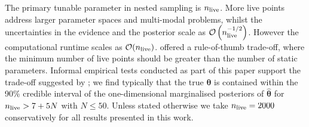 \documentclass[fleqn,usenatbib,useAMS]{mnras}
\begin{document}
The primary tunable parameter in nested sampling is $n_{\rm live}$. More live points address larger parameter spaces and multi-modal problems, whilst the uncertainties in the evidence and the posterior scale as $\mathcal{O}\left(n_{\rm live}^{-1/2}\right)$. However the computational runtime scales as $\mathcal{O}(n_{\rm live})$. \cite{Ashton2022} offered a rule-of-thumb trade-off, where the minimum number of live points should be greater than the number of static parameters. Informal empirical tests conducted as part of this paper support the trade-off suggested by \cite{Ashton2022}; we find typically that the true ${\boldsymbol{\theta}}$ is contained within the 90\% credible interval of the one-dimensional marginalised posteriors of ${\boldsymbol{\hat{\theta}}}$ for $n_{\rm live} > 7 + 5N$ with $N \leq 50$. Unless stated otherwise we take $n_{\rm live} = 2000$ conservatively for all results presented in this work. \newline 
\end{document}
